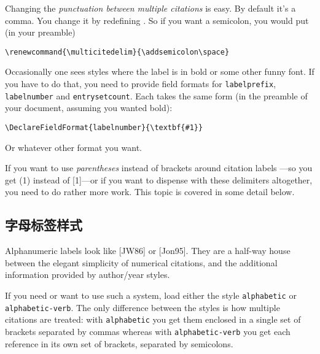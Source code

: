 Changing the \emph{punctuation between multiple citations} is easy. By
default it's a comma. You change it by redefining
. So
if you want a semicolon, you would put (in your preamble)
\begin{center}
\verb|\renewcommand{\multicitedelim}{\addsemicolon\space}|
\end{center}

Occasionally one sees styles where the label is in bold or some other
funny font. If you have to do that, you need to provide field formats
for \verb|labelprefix|, \verb|labelnumber| and
\verb|entrysetcount|. Each takes the same form (in the preamble of
your document, assuming you wanted bold):
\begin{center}
\verb|\DeclareFieldFormat{labelnumber}{\textbf{#1}}|
\end{center}
Or whatever other format you want.

If you want to use \emph{parentheses} instead of brackets around
citation labels ---so you get (1) instead of [1]---or if you want to
dispense with these delimiters altogether, you need to do rather more
work. This topic is covered in some detail below.
\subsection{字母标签样式}

Alphanumeric labels look like [JW86] or [Jon95]. They are a half-way
house between the elegant simplicity of numerical citations, and the
additional information provided by author/year styles.

If you need or want to use such a system, load either the style
\verb|alphabetic| or \verb|alphabetic-verb|. The only difference
between the styles is how multiple citations are treated: with
\verb|alphabetic| you get them enclosed in a single set of
brackets separated by
commas whereas with \verb|alphabetic-verb| you get each reference in
its own set of brackets, separated by
semicolons.

